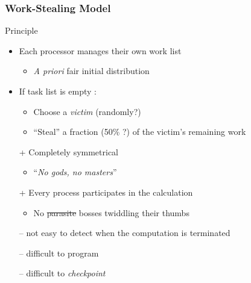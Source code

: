 \documentclass[xcolor={rgb,x11names,svgnames},rgb,x11names,svgnames]{beamer}
\begin{document}
\begin{frame}
  \frametitle{Work-Stealing Model}

  \begin{exampleblock}{Principle}
    
    \begin{itemize}
    \item Each processor manages their own work list
      
      \begin{itemize}
      \item \textit{A priori} fair initial distribution
      \end{itemize}
      
    \item If task list is empty :
      \begin{itemize}
      \item Choose a \emph{victim} (randomly?)
      \item ``Steal'' a fraction (50\% ?) of the victim's remaining work
      \end{itemize}
    \end{itemize}
  \end{exampleblock}
  
  \bigskip
  
  \begin{itemize}
  \item [+] Completely symmetrical
    \begin{itemize}
    \item ``\textit{No gods, no masters}'' \CircledA
    \end{itemize}
    
  \item [+] Every process participates in the calculation
    \begin{itemize}
    \item No \sout{parasite} bosses twiddling their thumbs
      
    \end{itemize}
  \item [--] not easy to detect when the computation is terminated
  \item [--] difficult to program
  \item [--] difficult to \emph{checkpoint}
  \end{itemize}
\end{frame}

\end{document}
